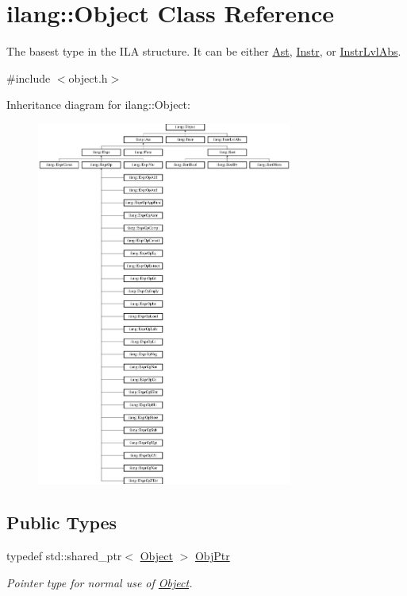 \hypertarget{classilang_1_1_object}{}\section{ilang\+:\+:Object Class Reference}
\label{classilang_1_1_object}


The basest type in the I\+LA structure. It can be either \mbox{\hyperlink{classilang_1_1_ast}{Ast}}, \mbox{\hyperlink{classilang_1_1_instr}{Instr}}, or \mbox{\hyperlink{classilang_1_1_instr_lvl_abs}{Instr\+Lvl\+Abs}}.  




{\ttfamily \#include $<$object.\+h$>$}

Inheritance diagram for ilang\+:\+:Object\+:\begin{figure}[H]
\begin{center}
\leavevmode
\includegraphics[height=12.000000cm]{classilang_1_1_object}
\end{center}
\end{figure}
\subsection*{Public Types}
\begin{DoxyCompactItemize}
\item 
\mbox{\label{classilang_1_1_object_af23d3767cfbc8cb9312281cbfa4aae48}} 
typedef std\+::shared\+\_\+ptr$<$ \mbox{\hyperlink{classilang_1_1_object}{Object}} $>$ \mbox{\hyperlink{classilang_1_1_object_af23d3767cfbc8cb9312281cbfa4aae48}{Obj\+Ptr}}
\begin{DoxyCompactList}\small\item\em Pointer type for normal use of \mbox{\hyperlink{classilang_1_1_object}{Object}}. \end{DoxyCompactList}\end{DoxyCompactItemize}
